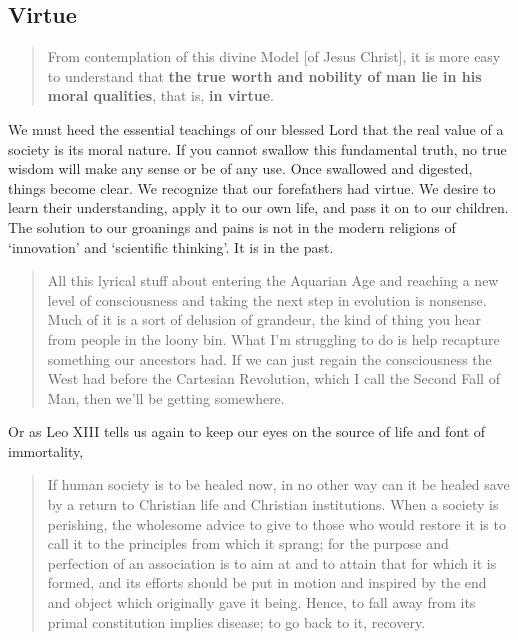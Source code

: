 \documentclass[letterpaper]{article}
\begin{document}
\subsection{Virtue}

\begin{quote}
  From contemplation of this divine Model [of Jesus Christ], it is more easy to understand that \textbf{the true worth and nobility of man lie in his moral qualities}, that is, \textbf{in virtue}.
\end{quote}

We must heed the essential teachings of our blessed Lord that the real value of a society is its moral nature. If you cannot swallow this fundamental truth, no true wisdom will make any sense or be of any use. Once swallowed and digested, things become clear. We recognize that our forefathers had virtue. We desire to learn their understanding, apply it to our own life, and pass it on to our children. The solution to our groanings and pains is not in the modern religions of `innovation' and `scientific thinking'. It is in the past.

\begin{quote}
  All this lyrical stuff about entering the Aquarian Age and reaching a new level of consciousness and taking the next step in evolution is nonsense. Much of it is a sort of delusion of grandeur, the kind of thing you hear from people in the loony bin. What I'm struggling to do is help recapture something our ancestors had. If we can just regain the consciousness the West had before the Cartesian Revolution, which I call the Second Fall of Man, then we'll be getting somewhere.

\end{quote}

Or as Leo XIII tells us again to keep our eyes on the source of life and font of immortality,

\begin{quote}
  If human society is to be healed now, in no other way can it be healed save by a return to Christian life and Christian institutions. When a society is perishing, the wholesome advice to give to those who would restore it is to call it to the principles from which it sprang; for the purpose and perfection of an association is to aim at and to attain that for which it is formed, and its efforts should be put in motion and inspired by the end and object which originally gave it being. Hence, to fall away from its primal constitution implies disease; to go back to it, recovery.
\end{quote}
\end{document}
